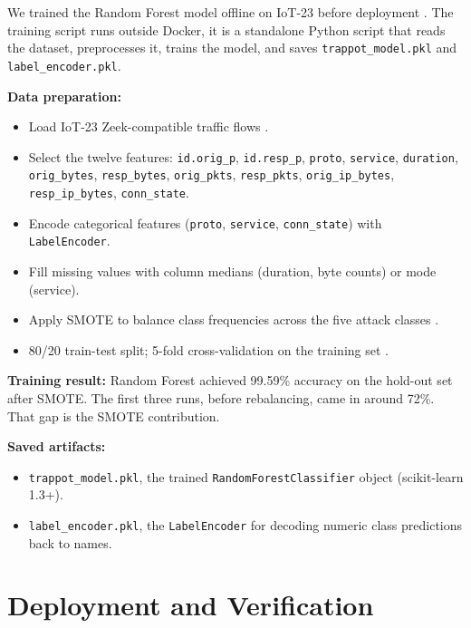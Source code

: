 We trained the Random Forest model offline on IoT-23 before deployment \cite{iot23dataset}. The training script runs outside Docker, it is a standalone Python script that reads the dataset, preprocesses it, trains the model, and saves \texttt{trappot\_model.pkl} and \texttt{label\_encoder.pkl}.

\textbf{Data preparation:}

\begin{itemize}
\item Load IoT-23 Zeek-compatible traffic flows \cite{iot23dataset,dekeersmaeker2023survey}.
\item Select the twelve features: \texttt{id.orig\_p}, \texttt{id.resp\_p}, \texttt{proto}, \texttt{service}, \texttt{duration}, \texttt{orig\_bytes}, \texttt{resp\_bytes}, \texttt{orig\_pkts}, \texttt{resp\_pkts}, \texttt{orig\_ip\_bytes}, \texttt{resp\_ip\_bytes}, \texttt{conn\_state}.
\item Encode categorical features (\texttt{proto}, \texttt{service}, \texttt{conn\_state}) with \texttt{LabelEncoder}.
\item Fill missing values with column medians (duration, byte counts) or mode (service).
\item Apply SMOTE to balance class frequencies across the five attack classes \cite{9213728,9912910,abdulsalam2023multiclass}.
\item 80/20 train-test split; 5-fold cross-validation on the training set \cite{optimized2024arxiv,karim2024efficient}.
\end{itemize}

\textbf{Training result:} Random Forest achieved 99.59\% accuracy on the hold-out set after SMOTE. The first three runs, before rebalancing, came in around 72\%. That gap is the SMOTE contribution.

\textbf{Saved artifacts:}
\begin{itemize}
\item \texttt{trappot\_model.pkl}, the trained \texttt{RandomForestClassifier} object (scikit-learn 1.3+).
\item \texttt{label\_encoder.pkl}, the \texttt{LabelEncoder} for decoding numeric class predictions back to names.
\end{itemize}

\section{Deployment and Verification}
\label{sec:integration_deployment}


